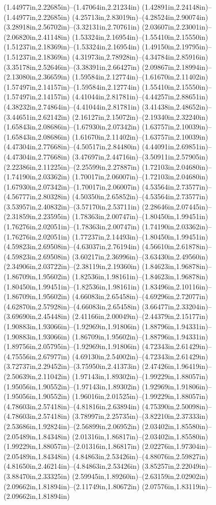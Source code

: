 (1.44977in,2.22685in)--(1.47064in,2.21234in) (1.42891in,2.24148in)--(1.44977in,2.22685in) (4.25713in,2.83019in)--(4.28524in,2.90074in) (3.28918in,2.56702in)--(3.32131in,2.70761in) (2.03607in,2.23001in)--(2.06820in,2.41148in) (1.53324in,2.16954in)--(1.55410in,2.15550in) (1.51237in,2.18369in)--(1.53324in,2.16954in) (1.49150in,2.19795in)--(1.51237in,2.18369in) (4.31973in,2.78928in)--(4.34784in,2.85916in) (3.35178in,2.52646in)--(3.38391in,2.66427in) (2.09867in,2.18994in)--(2.13080in,2.36659in) (1.59584in,2.12774in)--(1.61670in,2.11402in) (1.57497in,2.14157in)--(1.59584in,2.12774in) (1.55410in,2.15550in)--(1.57497in,2.14157in) (4.41044in,2.81781in)--(4.44257in,2.88651in) (4.38232in,2.74864in)--(4.41044in,2.81781in) (3.41438in,2.48652in)--(3.44651in,2.62142in) (2.16127in,2.15072in)--(2.19340in,2.32240in) (1.65843in,2.08686in)--(1.67930in,2.07342in) (1.63757in,2.10039in)--(1.65843in,2.08686in) (1.61670in,2.11402in)--(1.63757in,2.10039in) (4.47304in,2.77668in)--(4.50517in,2.84480in) (4.44091in,2.69851in)--(4.47304in,2.77668in) (3.47697in,2.44716in)--(3.50911in,2.57905in) (2.22386in,2.11225in)--(2.25599in,2.27887in) (1.72103in,2.04680in)--(1.74190in,2.03362in) (1.70017in,2.06007in)--(1.72103in,2.04680in) (1.67930in,2.07342in)--(1.70017in,2.06007in) (4.53564in,2.73577in)--(4.56777in,2.80328in) (4.50350in,2.65852in)--(4.53564in,2.73577in) (3.53957in,2.40832in)--(3.57170in,2.53711in) (2.28646in,2.07445in)--(2.31859in,2.23595in) (1.78363in,2.00747in)--(1.80450in,1.99451in) (1.76276in,2.02051in)--(1.78363in,2.00747in) (1.74190in,2.03362in)--(1.76276in,2.02051in) (1.77237in,2.14493in)--(1.80450in,1.99451in) (4.59823in,2.69508in)--(4.63037in,2.76194in) (4.56610in,2.61878in)--(4.59823in,2.69508in) (3.60217in,2.36996in)--(3.63430in,2.49560in) (2.34906in,2.03722in)--(2.38119in,2.19360in) (1.84623in,1.96878in)--(1.86709in,1.95602in) (1.82536in,1.98161in)--(1.84623in,1.96878in) (1.80450in,1.99451in)--(1.82536in,1.98161in) (1.83496in,2.10116in)--(1.86709in,1.95602in) (4.66083in,2.65458in)--(4.69296in,2.72077in) (4.62870in,2.57928in)--(4.66083in,2.65458in) (3.66477in,2.33204in)--(3.69690in,2.45448in) (2.41166in,2.00049in)--(2.44379in,2.15177in) (1.90883in,1.93066in)--(1.92969in,1.91806in) (1.88796in,1.94331in)--(1.90883in,1.93066in) (1.86709in,1.95602in)--(1.88796in,1.94331in) (1.89756in,2.05795in)--(1.92969in,1.91806in) (4.72343in,2.61429in)--(4.75556in,2.67977in) (4.69130in,2.54002in)--(4.72343in,2.61429in) (3.72737in,2.29452in)--(3.75950in,2.41373in) (2.47426in,1.96419in)--(2.50639in,2.11042in) (1.97143in,1.89302in)--(1.99229in,1.88057in) (1.95056in,1.90552in)--(1.97143in,1.89302in) (1.92969in,1.91806in)--(1.95056in,1.90552in) (1.96016in,2.01525in)--(1.99229in,1.88057in) (4.78603in,2.57418in)--(4.81816in,2.63894in) (4.75390in,2.50098in)--(4.78603in,2.57418in) (3.78997in,2.25735in)--(3.82210in,2.37333in) (2.53686in,1.92824in)--(2.56899in,2.06952in) (2.03402in,1.85580in)--(2.05489in,1.84348in) (2.01316in,1.86817in)--(2.03402in,1.85580in) (1.99229in,1.88057in)--(2.01316in,1.86817in) (2.02276in,1.97304in)--(2.05489in,1.84348in) (4.84863in,2.53426in)--(4.88076in,2.59827in) (4.81650in,2.46214in)--(4.84863in,2.53426in) (3.85257in,2.22049in)--(3.88470in,2.33325in) (2.59945in,1.89260in)--(2.63159in,2.02902in) (2.09662in,1.81894in)--(2.11749in,1.80672in) (2.07576in,1.83119in)--(2.09662in,1.81894in) 